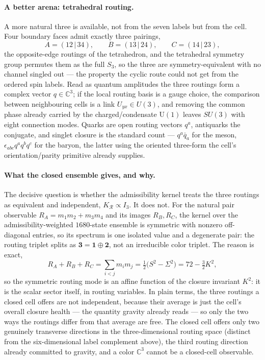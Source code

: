 \documentclass[11pt]{article}
\begin{document}
\paragraph{A better arena: tetrahedral routing.}
A more natural three is available, not from the seven labels but from the cell. Four boundary faces admit exactly three pairings,
\[
A=(12\,|\,34),\qquad B=(13\,|\,24),\qquad C=(14\,|\,23),
\]
the opposite-edge routings of the tetrahedron, and the tetrahedral symmetry group permutes them as the full $S_3$, so the three are symmetry-equivalent with no channel singled out --- the property the cyclic route could not get from the ordered spin labels. Read as quantum amplitudes the three routings form a complex vector $q\in\mathbb C^3$; if the local routing basis is a gauge choice, the comparison between neighbouring cells is a link $U_{yx}\in U(3)$, and removing the common phase already carried by the charged/condensate $\mathrm U(1)$ leaves $SU(3)$ with eight connection modes. Quarks are open routing vectors $q^a$, antiquarks the conjugate, and singlet closure is the standard count --- $q^a\bar q_a$ for the meson, $\epsilon_{abc}q^aq^bq^c$ for the baryon, the latter using the oriented three-form the cell's orientation/parity primitive already supplies.

\paragraph{What the closed ensemble gives, and why.}
The decisive question is whether the admissibility kernel treats the three routings as equivalent and independent, $K_{\mathcal R}\propto I_3$. It does not. For the natural pair observable $R_A=m_1m_2+m_3m_4$ and its images $R_B,R_C$, the kernel over the admissibility-weighted $1680$-state ensemble is symmetric with nonzero off-diagonal entries, so its spectrum is one isolated value and a degenerate pair: the routing triplet splits as $\mathbf3=\mathbf1\oplus\mathbf2$, not an irreducible color triplet. The reason is exact,
\[
R_A+R_B+R_C=\sum_{i<j}m_im_j=\tfrac12\bigl(S^2-\Sigma^2\bigr)=72-\tfrac32 K^2,
\]
so the symmetric routing mode is an affine function of the closure invariant $K^2$: it is the scalar sector itself, in routing variables. In plain terms, the three routings a closed cell offers are not independent, because their average is just the cell's overall closure health --- the quantity gravity already reads --- so only the two ways the routings differ from that average are free. The closed cell offers only two genuinely transverse directions in the three-dimensional routing space (distinct from the six-dimensional label complement above), the third routing direction already committed to gravity, and a color $\mathbb C^3$ cannot be a closed-cell observable.
\end{document}
